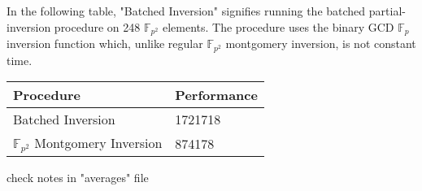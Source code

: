 \documentclass[10pt]{article}
\begin{document}
In the following table, "Batched Inversion" signifies running the batched partial-inversion procedure on 248 $\mathbb{F}_{p^{2}}$ elements. The procedure uses the binary GCD $\mathbb{F}_{p}$ inversion function which, unlike regular $\mathbb{F}_{p^{2}}$ montgomery inversion, is not constant time.\\

\begin{center}
\begin{tabular}{@{}ll@{}}
	\toprule
	Procedure & Performance \\
	\midrule
	Batched Inversion & 1721718\\
	$\mathbb{F}_{p^{2}}$ Montgomery Inversion & 874178\\
	\bottomrule
\end{tabular}
\end{center}

check notes in "averages" file\\
\end{document}
